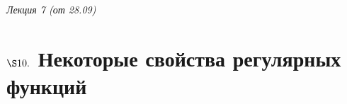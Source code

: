 \begin{flushright}
    \textit{Лекция 7 (от 28.09)}
\end{flushright}
\section{$\S 10.$ Некоторые свойства регулярных функций}
